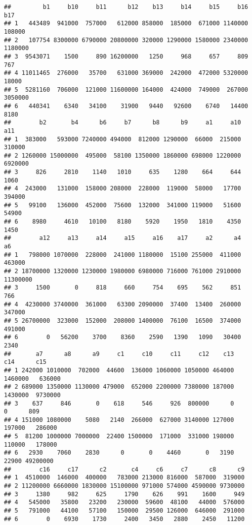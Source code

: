\documentclass[
]{article}
\begin{document}
\begin{verbatim}
##         b1     b10     b11      b12    b13     b14     b15     b16     b17
## 1   443489  941000  757000   612000 858000  185000  671000 1140000  108000
## 2   107754 8300000 6790000 20800000 320000 1290000 1580000 2340000 1180000
## 3  9543071    1500     890 16200000   1250     968     657     809     767
## 4 11011465  276000   35700   631000 369000  242000  472000 5320000   18000
## 5  5281160  706000  121000 11600000 164000  424000  749000  267000 3050000
## 6   440341    6340   34100    31900   9440   92600    6740   14400    8180
##        b2       b4      b6     b7      b8      b9     a1     a10     a11
## 1  383000   593000 7240000 494000  812000 1290000  66000  215000  310000
## 2 1260000 15000000  495000  58100 1350000 1860000 698000 1220000 6920000
## 3     826     2810    1140   1010     635    1280    664     644    1060
## 4  243000   131000  158000 208000  228000  119000  58000   17700  394000
## 5   99100   136000  452000  75600  132000  341000 119000   51600   54900
## 6    8980     4610   10100   8180    5920    1950   1810    4350    1450
##        a12     a13     a14     a15     a16    a17     a2      a4       a6
## 1   798000 1070000  228000  241000 1180000  15100 255000  411000   463000
## 2 18700000 1320000 1230000 1980000 6980000 716000 761000 2910000 11300000
## 3     1500       0     818     660     754    695    562     851      766
## 4  4230000 3740000  361000   63300 2090000  37400  13400  260000   347000
## 5 26700000  323000  152000  208000 1400000  76100  16500  374000   491000
## 6        0   56200    3700    8360    2590   1390   1090   30400     2340
##       a7      a8      a9     c1     c10     c11     c12    c13     c14      c15
## 1 242000 1010000  702000  44600  136000 1060000 1050000 464000 1460000   636000
## 2 689000 1350000 1130000 479000  652000 2200000 7380000 187000 1430000  9730000
## 3    637     846       0    618     546     926  800000      0       0      809
## 4 151000 1080000    5080   2140  266000  627000 3140000 127000  197000   286000
## 5  81200 1000000 7000000  22400 1500000  171000  331000 198000  110000   178000
## 6   2930    7060    2830      0       0    4460       0   3190   22900 49200000
##        c16     c17      c2       c4     c6     c7      c8      c9
## 1  4510000  146000  400000   783000 213000 816000  587000  319000
## 2 11200000 6660000 1830000 15100000 971000 574000 4590000 9730000
## 3     1380     982     625     1790    626    991    1600     949
## 4   545000   35800   23200   230000  59600  48100   44000  576000
## 5   791000   44100   57100   150000  29500 126000  646000  291000
## 6        0    6930    1730     2400   3450   2880    2450   11200
\end{verbatim}
\end{document}
